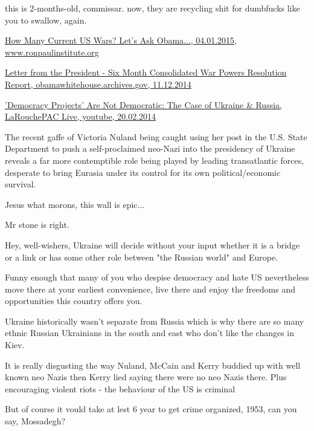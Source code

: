 \begin{itemize}
\begin{itemize}

this is 2-months-old, commissar. now, they are recycling shit for dumbfucks
like you to swallow, again.


\href{http://www.ronpaulinstitute.org/archives/peace-and-prosperity/2015/january/04/how-many-current-us-wars-lets-ask-obama}{%
How Many Current US Wars? Let's Ask Obama..., 04.01.2015, www.ronpaulinstitute.org%
}

\href{https://obamawhitehouse.archives.gov/the-press-office/2014/12/11/letter-president-six-month-consolidated-war-powers-resolution-report}{%
Letter from the President - Six Month Consolidated War Powers Resolution Report, obamawhitehouse.archives.gov, 11.12.2014%
}


\href{https://www.youtube.com/watch?v=_kmYRfNfRkM}{%
'Democracy Projects' Are Not Democratic: The Case of Ukraine \& Russia, LaRouchePAC Live, youtube, 20.02.2014%
}

The recent gaffe of Victoria Nuland being caught using her post in the U.S.
State Department to push a self-proclaimed neo-Nazi into the presidency of
Ukraine reveals a far more contemptible role being played by leading
transatlantic forces, desperate to bring Eurasia under its control for its own
political/economic survival.

Jesus what morons, this wall is epic...

Mr stone is right.


Hey, well-wishers, Ukraine will decide without your input whether it is a
bridge or a link or has some other role between "the Russian world" and Europe.

Funny enough that many of you who despise democracy and hate US nevertheless
move there at your earliest convenience, live there and enjoy the freedoms and
opportunities this country offers you.


Ukraine historically wasn't separate from Russia which is why there are so many
ethnic Russian Ukrainians in the south and east who don't like the changes in
Kiev.

It is really disgusting the way Nuland, McCain and Kerry buddied up with well
known neo Nazis then Kerry lied saying there were no neo Nazis there. Plus
encouraging violent riots - the behaviour of the US is criminal


But of course it vould take at lest 6 year to get crime organized, 1953, can
you say, Mossadegh?



\end{itemize} %

\end{itemize} %
